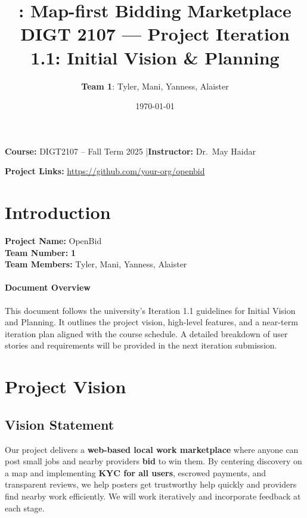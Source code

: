 \documentclass[11pt]{article}
\title{\product: Map-first Bidding Marketplace\\\Large DIGT 2107 --- Project Iteration 1.1: Initial Vision \& Planning}
\author{\textbf{Team 1}: Tyler, Mani, Yanness, Alaister}
\date{\today}
\newcommand{\product}{OpenBid}
\newcommand{\repoURL}{https://github.com/your-org/openbid}
\begin{document}
\maketitle

\begin{center}
\textbf{Course:} DIGT2107 -- Fall Term 2025 \quad|\quad \textbf{Instructor:} Dr.\ May Haidar
\end{center}

\begin{center}
\textbf{Project Links:} \href{\repoURL}{\repoURL}
\end{center}

\newpage

\section{Introduction}
\textbf{Project Name:} \product \\
\textbf{Team Number:} \textbf{1} \\
\textbf{Team Members:} Tyler, Mani, Yanness, Alaister

\paragraph{Document Overview}
This document follows the university's Iteration 1.1 guidelines for Initial Vision and Planning. It outlines the project vision, high-level features, and a near-term iteration plan aligned with the course schedule. A detailed breakdown of user stories and requirements will be provided in the next iteration submission.

\section{Project Vision}
\subsection*{Vision Statement}
Our project delivers a \textbf{web-based local work marketplace} where anyone can post small jobs and nearby providers \textbf{bid} to win them. By centering discovery on a map and implementing \textbf{KYC for all users}, escrowed payments, and transparent reviews, we help posters get trustworthy help quickly and providers find nearby work efficiently. We will work iteratively and incorporate feedback at each stage.
\end{document}
